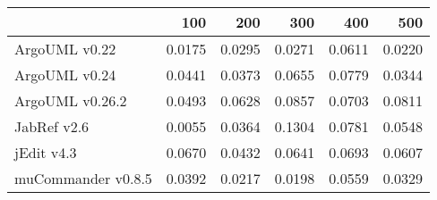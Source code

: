 \begin{tabular}{lrrrrr}
\toprule
{} &    100 &    200 &    300 &    400 &    500 \\
\midrule
ArgoUML v0.22      & 0.0175 & 0.0295 & 0.0271 & 0.0611 & 0.0220 \\
ArgoUML v0.24      & 0.0441 & 0.0373 & 0.0655 & 0.0779 & 0.0344 \\
ArgoUML v0.26.2    & 0.0493 & 0.0628 & 0.0857 & 0.0703 & 0.0811 \\
JabRef v2.6        & 0.0055 & 0.0364 & 0.1304 & 0.0781 & 0.0548 \\
jEdit v4.3         & 0.0670 & 0.0432 & 0.0641 & 0.0693 & 0.0607 \\
muCommander v0.8.5 & 0.0392 & 0.0217 & 0.0198 & 0.0559 & 0.0329 \\
\bottomrule
\end{tabular}

